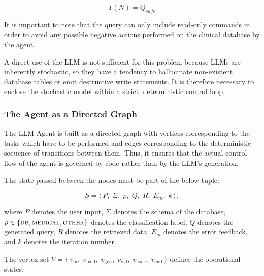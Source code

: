 \begin{equation}
    T(N) = Q_{safe}
    \label{eq:translation}
\end{equation}

It is important to note that the query can only include read-only commands in order to avoid any possible negative actions performed on the clinical database by the agent.

A direct use of the LLM is not sufficient for this problem because LLMs are inherently stochastic, so they have a tendency to hallucinate non-existent database tables or emit destructive write statements. It is therefore necessary to enclose the stochastic model within a strict, deterministic control loop.

\subsubsection*{The Agent as a Directed Graph}

The LLM Agent is built as a directed graph with vertices corresponding to the tasks which have to be performed and edges corresponding to the deterministic sequence of transitions between them. Thus, it ensures that the actual control flow of the agent is governed by code rather than by the LLM's generation.

\vspace{1em}

The state passed between the nodes must be part of the below tuple:

\begin{equation}
    S = \langle\, P,\; \Sigma,\; \rho,\; Q,\; R,\; E_m,\; k \,\rangle,
    \label{eq:state}
\end{equation}

where $P$ denotes the user input, $\Sigma$ denotes the schema of the database, $\rho \in \{\textsc{db}, \textsc{medical}, \textsc{other}\}$ denotes the classification label, $Q$ denotes the generated query, $R$ denotes the retrieved data, $E_m$ denotes the error feedback, and $k$ denotes the iteration number.

The vertex set $V = \{\, v_{\mathrm{in}},\; v_{\mathrm{med}},\; v_{\mathrm{gen}},\; v_{\mathrm{val}},\; v_{\mathrm{exec}},\; v_{\mathrm{end}} \,\}$ defines the operational states:

